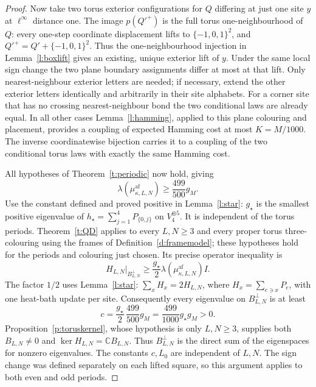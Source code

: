 \begin{proof}
Now take two torus exterior configurations for \(Q\) differing at
just one site \(y\) at \(\ell^\infty\) distance one.
The image \(p(Q'^+)\) is the full torus one-neighbourhood of \(Q\):
every one-step coordinate displacement lifts to
\(\{-1,0,1\}^2\), and
\(Q'^+=Q'+\{-1,0,1\}^2\).
Thus the one-neighbourhood injection in Lemma~\ref{l:boxlift}
gives an existing, unique exterior lift of \(y\).
Under the same local
sign change the two plane boundary assignments differ at most at
that lift.  Only nearest-neighbour exterior letters are needed; if
necessary, extend the other exterior letters identically and
arbitrarily in their site alphabets.  For a corner site that has no
crossing nearest-neighbour bond the two conditional laws are already
equal.  In all other cases Lemma~\ref{l:hamming}, applied to this
plane colouring and placement, provides a coupling of expected
Hamming cost at most \(K=M/1000\).  The inverse coordinatewise
bijection carries it to a coupling of the two conditional torus laws
with exactly the same Hamming cost.

All hypotheses of Theorem~\ref{t:periodic} now hold, giving
\[
 \lambda(\mu^{\mathrm{af}}_{\kappa,L,N})
                        \ge\frac{499}{500}g_M.
\]
Use the constant defined and proved positive in Lemma~\ref{l:star}:
\(g_\star\) is the smallest positive eigenvalue of
\(h_\star=\sum_{j=1}^4P_{\{0,j\}}\) on \(V_4^{\otimes5}\).
It is independent of the torus periods.  Theorem~\ref{t:QD} applies
to every \(L,N\ge3\) and every proper torus three-colouring using
the frames of Definition~\ref{d:framemodel}; these hypotheses hold
for the periods and colouring just chosen.  Its precise operator
inequality is
\[
 H_{L,N}\big|_{B_{L,N}^{\perp}}
       \ge\frac{g_\star}{2}
               \lambda(\mu^{\mathrm{af}}_{\kappa,L,N})I.
\]
The factor \(1/2\) uses Lemma~\ref{l:star}:
\(\sum_xH_x=2H_{L,N}\), where \(H_x=\sum_{e\ni x}P_e\),
with one heat-bath update per site.  Consequently every eigenvalue on
\(B_{L,N}^{\perp}\) is at least
\[
 c=\frac{g_\star}{2}\,\frac{499}{500}g_M
                         =\frac{499}{1000}g_\star g_M>0.
\]
Proposition~\ref{p:toruskernel}, whose hypothesis is only
\(L,N\ge3\), supplies both \(B_{L,N}\ne0\) and
\(\ker H_{L,N}=\mathbb C B_{L,N}\).  Thus \(B_{L,N}^{\perp}\)
is the direct sum of the eigenspaces for nonzero eigenvalues.
The constants \(c,L_0\) are independent of \(L,N\).
The sign change was defined separately on each lifted square, so this
argument applies to both even and odd periods.
\end{proof}


